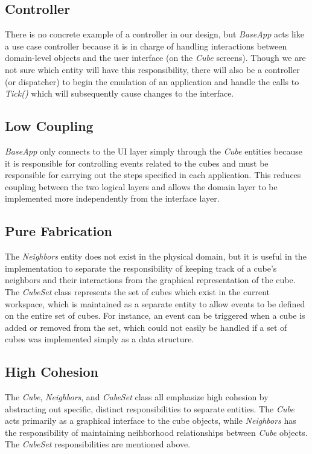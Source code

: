 \documentclass[12pt]{article}
\begin{document}
\subsection{Controller}
There is no concrete example of a controller in our design, but \textit{BaseApp} acts like a use case controller because it is in charge of handling interactions between domain-level objects and the user interface (on the \textit{Cube} screens). Though we are not sure which entity will have this responsibility, there will also be a controller (or dispatcher) to begin the emulation of an application and handle the calls to \textit{Tick()} which will subsequently cause changes to the interface.

\subsection{Low Coupling}
\textit{BaseApp} only connects to the UI layer simply through the \textit{Cube} entities because it is responsible for controlling events related to the cubes and must be responsible for carrying out the steps specified in each application. This reduces coupling between the two logical layers and allows the domain layer to be implemented more independently from the interface layer.

\subsection{Pure Fabrication}
The \textit{Neighbors} entity does not exist in the physical domain, but it is useful in the implementation to separate the responsibility of keeping track of a cube's neighbors and their interactions from the graphical representation of the cube. The \textit{CubeSet} class represents the set of cubes which exist in the current workspace, which is maintained as a separate entity to allow events to be defined on the entire set of cubes. For instance, an event can be triggered when a cube is added or removed from the set, which could not easily be handled if a set of cubes was implemented simply as a data structure.

\subsection{High Cohesion}
The \textit{Cube}, \textit{Neighbors}, and \textit{CubeSet} class all emphasize high cohesion by abstracting out specific, distinct responsibilities to separate entities. The \textit{Cube} acts primarily as a graphical interface to the cube objects, while \textit{Neighbors} has the responsibility of maintaining neihborhood relationships between \textit{Cube} objects. The \textit{CubeSet} responsibilities are mentioned above.
\end{document}
